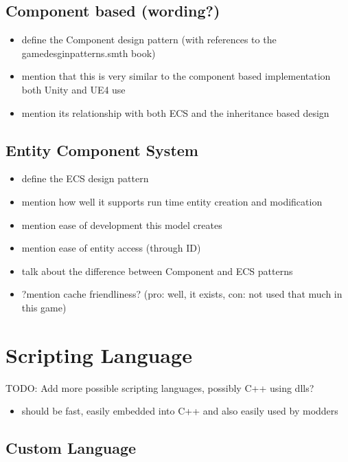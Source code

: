 \subsection{Component based (wording?)}

\begin{itemize}
    \item define the Component design pattern (with references to
         the gamedesginpatterns.smth book)
    \item mention that this is very similar to the component based implementation
         both Unity and UE4 use
    \item mention its relationship with both ECS and the inheritance based design
\end{itemize}

\subsection{Entity Component System}

\begin{itemize}
    \item define the ECS design pattern
    \item mention how well it supports run time entity creation and modification
    \item mention ease of development this model creates
    \item mention ease of entity access (through ID)
    \item talk about the difference between Component and ECS patterns
    \item ?mention cache friendliness? (pro: well, it exists, con: not used that
        much in this game)
\end{itemize}

\section{Scripting Language}

TODO: Add more possible scripting languages, possibly C++ using dlls?
\begin{itemize}
    \item should be fast, easily embedded into C++ and also
        easily used by modders
\end{itemize}

\subsection{Custom Language}

